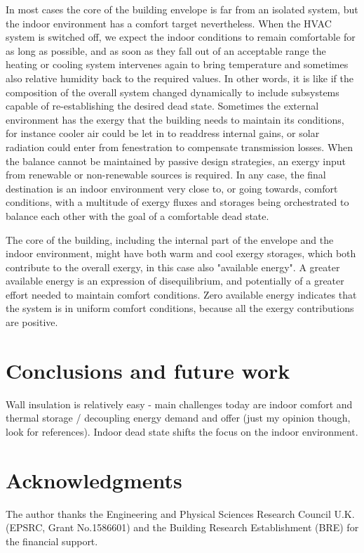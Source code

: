 \documentclass[10pt]{extarticle} %
\begin{document}
In most cases the core of the building envelope is far from an isolated system, but the indoor environment has a comfort target nevertheless. When the HVAC system is switched off, we expect the indoor conditions to remain comfortable for as long as possible, and as soon as they fall out of an acceptable range the heating or cooling system intervenes again to bring temperature and sometimes also relative humidity back to the required values. In other words, it is like if the composition of the overall system changed dynamically to include subsystems capable of re-establishing the desired dead state. Sometimes the external environment has the exergy that the building needs to maintain its conditions, for instance cooler air could be let in to readdress internal gains, or solar radiation could enter from fenestration to compensate transmission losses. When the balance cannot be maintained by passive design strategies, an exergy input from renewable or non-renewable sources is required. In any case, the final destination is an indoor environment very close to, or going towards, comfort conditions, with a multitude of exergy fluxes and storages being orchestrated to balance each other with the goal of a comfortable dead state.

The core of the building, including the internal part of the envelope and the indoor environment, might have both warm and cool exergy storages, which both contribute to the overall exergy, in this case also "available energy". A greater available energy is an expression of disequilibrium, and potentially of a greater effort needed to maintain comfort conditions. Zero available energy indicates that the system is in uniform comfort conditions, because all the exergy contributions are positive.





\section{Conclusions and future work}
Wall insulation is relatively easy - main challenges today are indoor comfort and thermal storage / decoupling energy demand and offer (just my opinion though, look for references). Indoor dead state shifts the focus on the indoor environment.

\section*{Acknowledgments}

The author thanks the Engineering and Physical Sciences Research Council U.K. (EPSRC, Grant No.1586601) and the Building Research Establishment (BRE) for the financial support.

{\small %
 
}

\vfill \break
\end{document}
